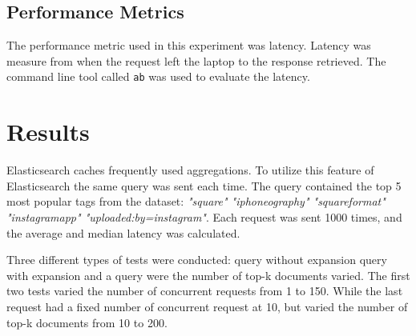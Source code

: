 \subsection{Performance Metrics}
The performance metric used in this experiment was latency.
Latency was measure from when the request left the laptop to the response retrieved.
The command line tool called \texttt{ab} \cite{apache-benchmark} was used to evaluate the latency.




\section{Results}
Elasticsearch caches frequently used aggregations.
To utilize this feature of Elasticsearch the same query was sent each time.
The query contained the top 5 most popular tags from the dataset: \textit{"square" "iphoneography" "squareformat" "instagramapp" "uploaded:by=instagram"}.
Each request was sent 1000 times, and the average and median latency was calculated.

Three different types of tests were conducted: query without expansion query with expansion and a query were the number of top-k documents varied.
The first two tests varied the number of concurrent requests from 1 to 150.
While the last request had a fixed number of concurrent request at 10,
but varied the number of top-k documents from 10 to 200.

